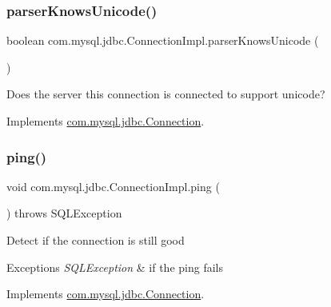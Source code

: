 \subsubsection{\texorpdfstring{parser\+Knows\+Unicode()}{parserKnowsUnicode()}}
{\footnotesize\ttfamily boolean com.\+mysql.\+jdbc.\+Connection\+Impl.\+parser\+Knows\+Unicode (\begin{DoxyParamCaption}{ }\end{DoxyParamCaption})}

Does the server this connection is connected to support unicode? 

Implements \mbox{\hyperlink{interfacecom_1_1mysql_1_1jdbc_1_1_connection_a09e06dca89e57de8d11e9e9ff2d78f4d}{com.\+mysql.\+jdbc.\+Connection}}.

\mbox{\label{classcom_1_1mysql_1_1jdbc_1_1_connection_impl_a8a8888884eb200c850f66c3708afad14}} 
\subsubsection{\texorpdfstring{ping()}{ping()}}
{\footnotesize\ttfamily void com.\+mysql.\+jdbc.\+Connection\+Impl.\+ping (\begin{DoxyParamCaption}{ }\end{DoxyParamCaption}) throws S\+Q\+L\+Exception}

Detect if the connection is still good


\begin{DoxyExceptions}{Exceptions}
{\em S\+Q\+L\+Exception} & if the ping fails \\
\hline
\end{DoxyExceptions}


Implements \mbox{\hyperlink{interfacecom_1_1mysql_1_1jdbc_1_1_connection_a65a9bf75714ed318b0324f99dfa09761}{com.\+mysql.\+jdbc.\+Connection}}.

